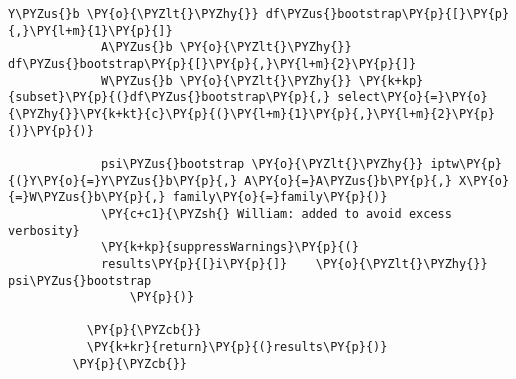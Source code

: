 \begin{Verbatim}[commandchars=\\\{\}]
             Y\PYZus{}b \PY{o}{\PYZlt{}\PYZhy{}} df\PYZus{}bootstrap\PY{p}{[}\PY{p}{,}\PY{l+m}{1}\PY{p}{]}
             A\PYZus{}b \PY{o}{\PYZlt{}\PYZhy{}} df\PYZus{}bootstrap\PY{p}{[}\PY{p}{,}\PY{l+m}{2}\PY{p}{]}
             W\PYZus{}b \PY{o}{\PYZlt{}\PYZhy{}} \PY{k+kp}{subset}\PY{p}{(}df\PYZus{}bootstrap\PY{p}{,} select\PY{o}{=}\PY{o}{\PYZhy{}}\PY{k+kt}{c}\PY{p}{(}\PY{l+m}{1}\PY{p}{,}\PY{l+m}{2}\PY{p}{)}\PY{p}{)}
         
             psi\PYZus{}bootstrap \PY{o}{\PYZlt{}\PYZhy{}} iptw\PY{p}{(}Y\PY{o}{=}Y\PYZus{}b\PY{p}{,} A\PY{o}{=}A\PYZus{}b\PY{p}{,} X\PY{o}{=}W\PYZus{}b\PY{p}{,} family\PY{o}{=}family\PY{p}{)}
             \PY{c+c1}{\PYZsh{} William: added to avoid excess verbosity}
             \PY{k+kp}{suppressWarnings}\PY{p}{(}
             results\PY{p}{[}i\PY{p}{]}    \PY{o}{\PYZlt{}\PYZhy{}} psi\PYZus{}bootstrap
                 \PY{p}{)}
               
           \PY{p}{\PYZcb{}}
           \PY{k+kr}{return}\PY{p}{(}results\PY{p}{)}
         \PY{p}{\PYZcb{}}
\end{Verbatim}


